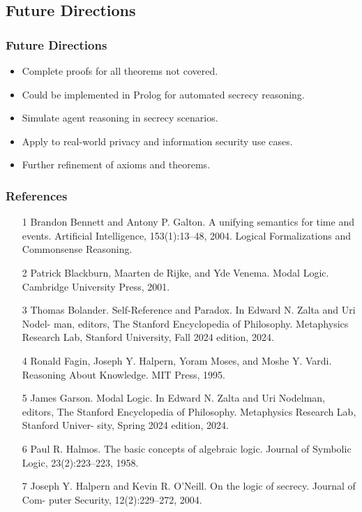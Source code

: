 \documentclass[aspectratio=169]{beamer}
\begin{document}
\subsection{Future Directions}
\begin{frame}
\frametitle{Future Directions}
\begin{itemize}
    \Large
    \item Complete proofs for all theorems not covered.
    \item Could be implemented in Prolog for automated secrecy reasoning.
    \item Simulate agent reasoning in secrecy scenarios.
    \item Apply to real-world privacy and information security use cases.
    \item Further refinement of axioms and theorems.
\end{itemize}
\end{frame}


\begin{frame}
\frametitle{References}
\footnotesize
\begin{itemize}
    \item [1] Brandon Bennett and Antony P. Galton. A unifying semantics for time and events.
    Artificial Intelligence, 153(1):13–48, 2004. Logical Formalizations and Commonsense
    Reasoning.
    \item [2] Patrick Blackburn, Maarten de Rijke, and Yde Venema. Modal Logic. Cambridge
    University Press, 2001.
    \item [3] Thomas Bolander. Self-Reference and Paradox. In Edward N. Zalta and Uri Nodel-
    man, editors, The Stanford Encyclopedia of Philosophy. Metaphysics Research Lab,
    Stanford University, Fall 2024 edition, 2024.
    \item [4] Ronald Fagin, Joseph Y. Halpern, Yoram Moses, and Moshe Y. Vardi. Reasoning
    About Knowledge. MIT Press, 1995.
    \item [5] James Garson. Modal Logic. In Edward N. Zalta and Uri Nodelman, editors, The
    Stanford Encyclopedia of Philosophy. Metaphysics Research Lab, Stanford Univer-
    sity, Spring 2024 edition, 2024.
    \item [6] Paul R. Halmos. The basic concepts of algebraic logic. Journal of Symbolic Logic,
    23(2):223–223, 1958.
    \item [7] Joseph Y. Halpern and Kevin R. O’Neill. On the logic of secrecy. Journal of Com-
    puter Security, 12(2):229–272, 2004.
\end{itemize}
\end{frame}
\end{document}
